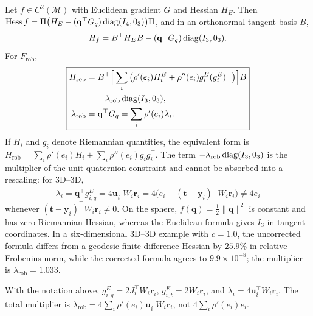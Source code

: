 \begin{lemma}\label{lem:hessian}
Let $f\in C^2(\mathcal{M})$ with Euclidean gradient $G$ and Hessian $H_E$. Then
$\operatorname{Hess}f=\Pi\big(H_E-(\mathbf{q}^\top G_q)\operatorname{diag}(I_4,0_3)\big)\Pi$, and in an
orthonormal tangent basis $B$,
\begin{equation}
H_f=B^\top H_E B-(\mathbf{q}^\top G_q)\operatorname{diag}(I_3,0_3).
\end{equation}
For $F_{\mathrm{rob}}$,
\begin{equation}
\boxed{
\begin{aligned}
H_{\mathrm{rob}}&=B^\top\Big[\sum_i\big(\rho'(e_i)H_i^E+\rho''(e_i)g_i^E(g_i^E)^\top\big)\Big]B\\
&\quad-\lambda_{\mathrm{rob}}\operatorname{diag}(I_3,0_3),\\
\lambda_{\mathrm{rob}}&=\mathbf{q}^\top G_q=\sum_i\rho'(e_i)\lambda_i .
\end{aligned}}
\end{equation}
If $H_i$ and $g_i$ denote Riemannian quantities, the equivalent form is
$H_{\mathrm{rob}}=\sum_i\rho'(e_i)H_i+\sum_i\rho''(e_i)g_ig_i^\top$. The term
$-\lambda_{\mathrm{rob}}\operatorname{diag}(I_3,0_3)$ is the multiplier of the unit-quaternion constraint and
cannot be absorbed into a rescaling: for 3D--3D,
\begin{equation}
\lambda_i=\mathbf{q}^\top g_{i,q}^E=4\mathbf{u}_i^\top W_i\mathbf{r}_i
=4\big(e_i-(\mathbf{t}-\mathbf{y}_i)^\top W_i\mathbf{r}_i\big)\neq4e_i
\end{equation}
whenever $(\mathbf{t}-\mathbf{y}_i)^\top W_i\mathbf{r}_i\neq0$. On the sphere,
$f(\mathbf{q})=\frac12\|\mathbf{q}\|^2$ is constant and has zero Riemannian Hessian, whereas the
Euclidean formula gives $I_3$ in tangent coordinates. In a six-dimensional 3D--3D example with
$c=1.0$, the uncorrected formula differs from a geodesic finite-difference Hessian by $25.9\%$ in
relative Frobenius norm, while the corrected formula agrees to $9.9\times10^{-8}$; the multiplier
is $\lambda_{\mathrm{rob}}=1.033$.
\end{lemma}

\begin{lemma}[3D--3D weights]\label{lem:weights}
With the notation above, $g_{i,q}^E=2J_i^\top W_i\mathbf{r}_i$, $g_{i,t}^E=2W_i\mathbf{r}_i$, and
$\lambda_i=4\mathbf{u}_i^\top W_i\mathbf{r}_i$. The total multiplier is
$\lambda_{\mathrm{rob}}=4\sum_i\rho'(e_i)\mathbf{u}_i^\top W_i\mathbf{r}_i$, not
$4\sum_i\rho'(e_i)e_i$.
\end{lemma}

